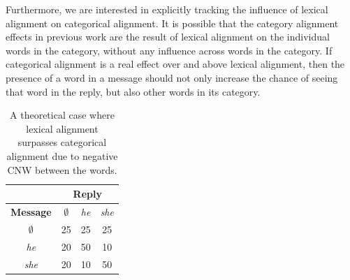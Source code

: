 \documentclass[11pt]{article}
\begin{document}

Furthermore, we are interested in explicitly tracking the influence of lexical alignment on categorical alignment.  It is possible that the category alignment effects in previous work are the result of lexical alignment on the individual words in the category, without any influence across words in the category. If categorical alignment is a real effect over and above lexical alignment, then the presence of a word in a message should not only increase the chance of seeing that word in the reply, but also other words in its category.


\begin{table}[t]
\begin{center}
\begin{tabular}{|c||c|c|c|}
\hline 
& \multicolumn{3}{|c|}{\bf Reply} \\ 
\hline
\bf Message & $\emptyset$ & \textit{he} & \textit{she} \\ \hline
$\emptyset$ & 25 & 25 & 25\\
\textit{he} & 20 & 50 & 10 \\
\textit{she} & 20 & 10 & 50 \\
\hline
\end{tabular}
\end{center}
\caption{\label{table:cnw-example1} A theoretical case where lexical alignment surpasses categorical alignment due to negative CNW between the words.}
\end{table}
\end{document}
